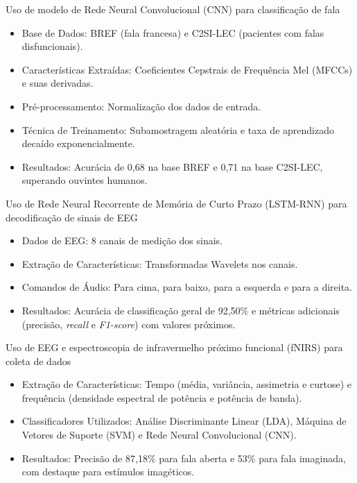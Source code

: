 \documentclass{beamer}
\begin{document}
	\begin{frame}{Uso de modelo de Rede Neural Convolucional (CNN) para classificação de fala \cite{abderrazek20_interspeech}}
		\begin{itemize}
			\item Base de Dados: BREF (fala francesa) e C2SI-LEC (pacientes com falas disfuncionais).
			\item Características Extraídas: Coeficientes Cepstrais de Frequência Mel (MFCCs) e suas derivadas.
			\item Pré-processamento: Normalização dos dados de entrada.
			\item Técnica de Treinamento: Subamostragem aleatória e taxa de aprendizado decaído exponencialmente.
			\item Resultados: Acurácia de 0,68 na base BREF e 0,71 na base C2SI-LEC, superando ouvintes humanos.
		\end{itemize}
		
	\end{frame}

	\begin{frame}{Uso de Rede Neural Recorrente de Memória de Curto Prazo (LSTM-RNN) para decodificação de sinais de EEG \cite{pawar2022wavelet}}
		\begin{itemize}
			\item Dados de EEG: 8 canais de medição dos sinais.
			\item Extração de Características: Transformadas Wavelets nos canais.
			\item Comandos de Áudio: Para cima, para baixo, para a esquerda e para a direita.
			\item Resultados: Acurácia de classificação geral de 92,50\% e métricas adicionais (precisão, \textit{recall} e \textit{F1-score}) com valores próximos.
		\end{itemize}
		
	\end{frame}
	
	\begin{frame}{Uso de EEG e espectroscopia de infravermelho próximo funcional (fNIRS) para coleta de dados \cite{cooney2021bimodal}}
		\begin{itemize}
			\item Extração de Características: Tempo (média, variância, assimetria e curtose) e frequência (densidade espectral de potência e potência de banda).
			\item Classificadores Utilizados: Análise Discriminante Linear (LDA), Máquina de Vetores de Suporte (SVM) e Rede Neural Convolucional (CNN).
			\item Resultados: Precisão de 87,18\% para fala aberta e 53\% para fala imaginada, com destaque para estímulos imagéticos.
		\end{itemize}
		
	\end{frame}
	
\end{document}
